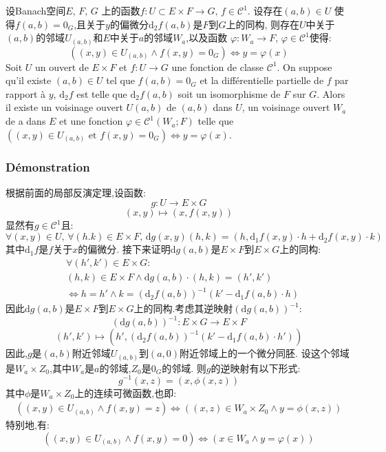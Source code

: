 \documentclass[12pt, a4paper, oneside]{ctexbook}
\newcommand{\di }{\text{d}}%
\newcommand{\fuyi }{^{-1}}%
\newcommand{\fai }{\varphi}%
\newcommand{\C }{\mathcal{C}}%
\begin{document}
  \indent
  设Banach空间$E,\,F,\,G$ 上的函数$f:U\subset E\times F\rightarrow G,\,f\in\C^1$.
  设存在$(a,b)\in U$ 使得$f(a,b)=0_G$,且关于$y$的偏微分$\di_2f(a,b)$是$F$到$G$上的同构,
  则存在$U$中关于$(a,b)$的邻域$U_{(a,b)}$和$E$中关于$a$的邻域$W_a$,以及函数
  $\fai:W_a\rightarrow F,\,\fai\in \C^1$使得:
  $$
    ((x,y)\in U_{(a,b)}\land f(x,y)=0_G)\Leftrightarrow y=\fai(x)
  $$
  \indent
  Soit $U$ un ouvert de $E\times F$ et $f:U\rightarrow G$ une fonction de classe $\C^1$.
  On suppose qu'il existe $(a, b) \in U$ tel que $f(a,b)=0_G$ et la différentielle partielle de $f$ par rapport à $y$, 
  $\di_2 f$ est telle que $\di_2 f (a, b)$ soit un isomorphisme de $F$ sur $G$.
  Alors il existe un voisinage ouvert $U(a,b)$ de $(a, b)$ dans $U$, 
  un voisinage ouvert $W_a$ de a dans $E$ et une fonction $\fai \in \C^1(W_a; F)$ telle que$((x,y)\in U_{(a,b)}\text{ et } f(x,y)=0_G)\Leftrightarrow y=\fai(x)$.
  \subsubsection{Démonstration}
  根据前面的局部反演定理,设函数:
  $$
    g:U\rightarrow E\times G
  $$
  $$
    (x,y)\mapsto (x,f(x,y))
  $$
  显然有$g\in\C^1 $且:
  $$
    \forall (x,y)\in U,\,\forall(h.k)\in E\times F,\,\di g(x,y)(h,k)=(h,\di_1f(x,y)\cdot h+\di_2f(x,y)\cdot k)
  $$
  其中$\di_1f$是$f$关于$x$的偏微分.
  接下来证明$\di g(a,b)$是$E\times F$到$E\times G$上的同构:
  \begin{align*}
    & \forall(h',k')\in E\times G:\,\\
    & (h,k)\in E\times F\land \di g(a,b)\cdot(h,k)=(h',k')\\
    & \Leftrightarrow h=h'\land k=(\di_2f(a,b))\fuyi(k'-\di_1f(a,b)\cdot h)
  \end{align*}
  因此$\di g(a,b)$是$E\times F$到$E\times G$上的同构.考虑其逆映射$(\di g(a,b))\fuyi$:
  $$
  (\di g(a,b))\fuyi:E\times G\rightarrow E\times F
  $$
  $$
    (h',k')\mapsto (h',(\di_2f(a,b))\fuyi(k'-\di_1f(a,b)\cdot h'))
  $$
  因此,$g$是$(a,b)$附近邻域$U_{(a,b)}$到$(a,0)$附近邻域上的一个微分同胚.
  设这个邻域是$W_a\times Z_0$,其中$W_a$是$a$的邻域,$Z_0$是$0_G$的邻域.
  则$g$的逆映射有以下形式:
  $$
    g\fuyi(x,z)=(x,\phi(x,z))
  $$
  其中$\phi$是$W_a\times Z_0$上的连续可微函数,也即:
  \begin{align*}
     ((x,y)\in U_{(a,b)}\land f(x,y)=z)
     \Leftrightarrow ((x,z)\in W_a\times Z_0\land y=\phi(x,z))
  \end{align*}
  特别地,有:
  $$
  ((x,y)\in U_{(a,b)}\land f(x,y)=0)\Leftrightarrow(x\in W_a\land y=\fai(x))
  $$
\end{document}
